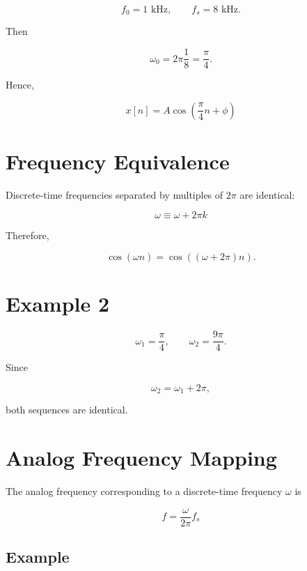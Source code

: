 \[
f_0=1\text{ kHz},
\qquad
f_s=8\text{ kHz}.
\]

Then

\[
\omega_0=
2\pi\frac{1}{8}
=
\frac{\pi}{4}.
\]

Hence,

\[
\boxed{
x[n]=A\cos\left(\frac{\pi}{4}n+\phi\right)
}
\]


\section{Frequency Equivalence}

Discrete-time frequencies separated by multiples of \(2\pi\) are identical:

\[
\boxed{
\omega\equiv\omega+2\pi k
}
\]

Therefore,

\[
\cos(\omega n)=\cos((\omega+2\pi)n).
\]


\section{Example 2}

\[
\omega_1=\frac{\pi}{4},
\qquad
\omega_2=\frac{9\pi}{4}.
\]

Since

\[
\omega_2=\omega_1+2\pi,
\]

both sequences are identical.


\section{Analog Frequency Mapping}

The analog frequency corresponding to a discrete-time frequency \(\omega\) is

\[
\boxed{
f=\frac{\omega}{2\pi}f_s
}
\]


\subsection{Example}

